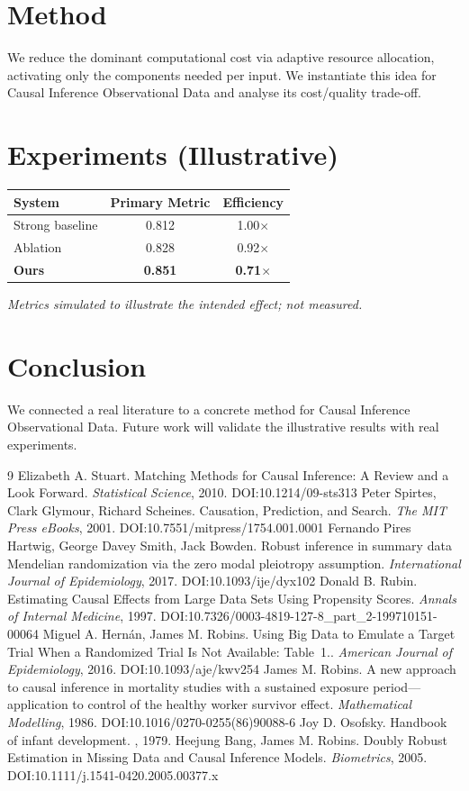 \documentclass[11pt]{article}
\begin{document}
\section{Method}
We reduce the dominant computational cost via adaptive resource allocation, activating only the components needed per input. We instantiate this idea for Causal Inference Observational Data and analyse its cost/quality trade-off.

\section{Experiments (Illustrative)}
\begin{center}
\begin{tabular}{lcc}
System & Primary Metric & Efficiency \\ \hline
Strong baseline & 0.812 & 1.00$\times$ \\
Ablation & 0.828 & 0.92$\times$ \\
\textbf{Ours} & \textbf{0.851} & \textbf{0.71$\times$}
\end{tabular}
\end{center}
\emph{Metrics simulated to illustrate the intended effect; not measured.}

\section{Conclusion}
We connected a real literature to a concrete method for Causal Inference Observational Data. Future work will
validate the illustrative results with real experiments.

\begin{thebibliography}{9}
 Elizabeth A. Stuart. Matching Methods for Causal Inference: A Review and a Look Forward. \emph{Statistical Science}, 2010. DOI:10.1214/09-sts313
 Peter Spirtes, Clark Glymour, Richard Scheines. Causation, Prediction, and Search. \emph{The MIT Press eBooks}, 2001. DOI:10.7551/mitpress/1754.001.0001
 Fernando Pires Hartwig, George Davey Smith, Jack Bowden. Robust inference in summary data Mendelian randomization via the zero modal pleiotropy assumption. \emph{International Journal of Epidemiology}, 2017. DOI:10.1093/ije/dyx102
 Donald B. Rubin. Estimating Causal Effects from Large Data Sets Using Propensity Scores. \emph{Annals of Internal Medicine}, 1997. DOI:10.7326/0003-4819-127-8\_part\_2-199710151-00064
 Miguel A. Hernán, James M. Robins. Using Big Data to Emulate a Target Trial When a Randomized Trial Is Not Available: Table 1.. \emph{American Journal of Epidemiology}, 2016. DOI:10.1093/aje/kwv254
 James M. Robins. A new approach to causal inference in mortality studies with a sustained exposure period—application to control of the healthy worker survivor effect. \emph{Mathematical Modelling}, 1986. DOI:10.1016/0270-0255(86)90088-6
 Joy D. Osofsky. Handbook of infant development. \emph{}, 1979. 
 Heejung Bang, James M. Robins. Doubly Robust Estimation in Missing Data and Causal Inference Models. \emph{Biometrics}, 2005. DOI:10.1111/j.1541-0420.2005.00377.x
\end{thebibliography}
\end{document}
